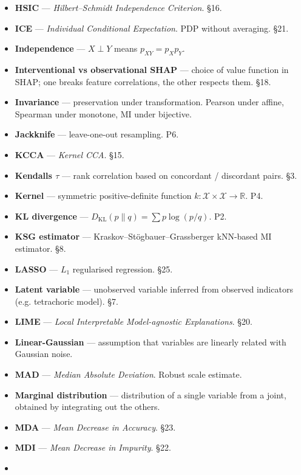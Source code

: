 \documentclass{article}
\begin{document}
\begin{itemize}
\item
  \textbf{HSIC} --- \emph{Hilbert--Schmidt Independence Criterion}. §16.
\item
  \textbf{ICE} --- \emph{Individual Conditional Expectation}. PDP
  without averaging. §21.
\item
  \textbf{Independence} --- \(X \perp Y\) means \(p_{XY} = p_X p_Y\).
\item
  \textbf{Interventional vs observational SHAP} --- choice of value
  function in SHAP; one breaks feature correlations, the other respects
  them. §18.
\item
  \textbf{Invariance} --- preservation under transformation. Pearson
  under affine, Spearman under monotone, MI under bijective.
\item
  \textbf{Jackknife} --- leave-one-out resampling. P6.
\item
  \textbf{KCCA} --- \emph{Kernel CCA}. §15.
\item
  \textbf{Kendall\textquotesingle s \(\tau\)} --- rank correlation based
  on concordant / discordant pairs. §3.
\item
  \textbf{Kernel} --- symmetric positive-definite function
  \(k: \mathcal{X} \times \mathcal{X} \to \mathbb{R}\). P4.
\item
  \textbf{KL divergence} ---
  \(D_{\mathrm{KL}}(p \| q) = \sum p \log(p/q)\). P2.
\item
  \textbf{KSG estimator} --- Kraskov--Stögbauer--Grassberger kNN-based
  MI estimator. §8.
\item
  \textbf{LASSO} --- \(L_1\) regularised regression. §25.
\item
  \textbf{Latent variable} --- unobserved variable inferred from
  observed indicators (e.g. tetrachoric model). §7.
\item
  \textbf{LIME} --- \emph{Local Interpretable Model-agnostic
  Explanations}. §20.
\item
  \textbf{Linear-Gaussian} --- assumption that variables are linearly
  related with Gaussian noise.
\item
  \textbf{MAD} --- \emph{Median Absolute Deviation}. Robust scale
  estimate.
\item
  \textbf{Marginal distribution} --- distribution of a single variable
  from a joint, obtained by integrating out the others.
\item
  \textbf{MDA} --- \emph{Mean Decrease in Accuracy}. §23.
\item
  \textbf{MDI} --- \emph{Mean Decrease in Impurity}. §22.
\item

\end{itemize}
\end{document}
